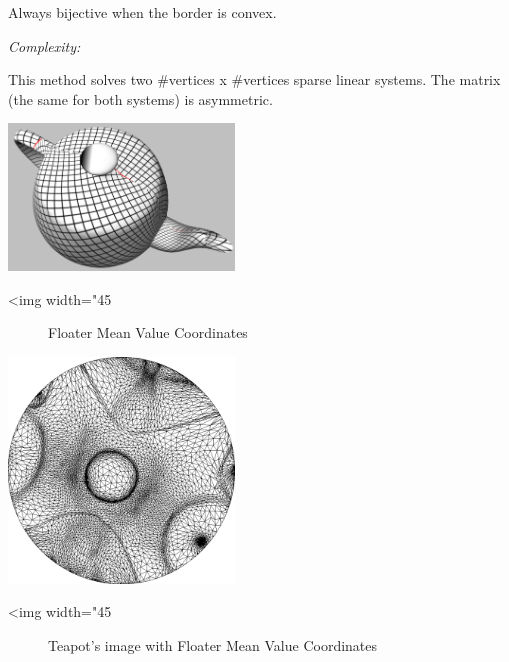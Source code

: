Always bijective when the border is convex.

\emph{Complexity:}

This method solves
two \#vertices x \#vertices sparse linear systems. The matrix (the
same for both systems) is asymmetric.

\begin{center}
    \label{Surface_mesh_parameterization-fig-floater}
    \begin{ccTexOnly}
        \includegraphics[width=0.45\textwidth]{Surface_mesh_parameterization/floater}
    \end{ccTexOnly}
    \begin{ccHtmlOnly}
        <img width="45%
    \end{ccHtmlOnly}
    \begin{figure}[h]
        \caption{Floater Mean Value Coordinates}
    \end{figure}
\end{center}

\begin{center}
    \label{Surface_mesh_parameterization-fig-floater_2}
    \begin{ccTexOnly}
        \includegraphics[width=0.45\textwidth]{Surface_mesh_parameterization/floater_2}
    \end{ccTexOnly}
    \begin{ccHtmlOnly}
        <img width="45%
    \end{ccHtmlOnly}
    \begin{figure}[h]
        \caption{Teapot's image with Floater Mean Value Coordinates}
    \end{figure}
\end{center}


